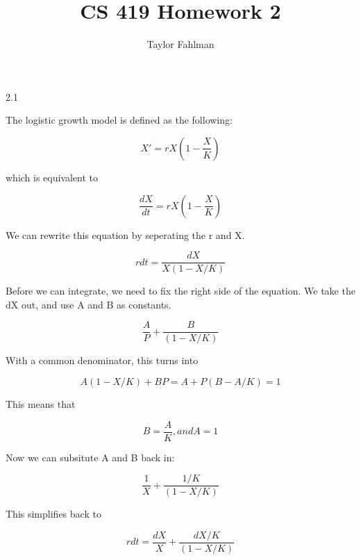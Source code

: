 \documentclass{article}
\begin{document}
\title{CS 419 Homework 2}
\author{Taylor Fahlman}
\maketitle
\begin{flushleft}
2.1\\
\end{flushleft}

The logistic growth model is defined as the following:

\begin{equation}
    X' = rX(1-\dfrac{X}{K})
\end{equation}

which is equivalent to

\begin{equation}
    \dfrac{dX}{dt} = rX(1-\dfrac{X}{K})
\end{equation}
    
We can rewrite this equation by seperating the r and X.

\begin{equation}
    r dt = \dfrac{dX}{X(1-X/K)}
\end{equation}

Before we can integrate, we need to fix the right side of the equation. We take the dX out, and use A and B as constants.

\begin{equation}
    \dfrac{A}{P} + \dfrac{B}{(1-X/K)}
\end{equation}

With a common denominator, this turns into

\begin{equation}
    A(1-X/K) + BP = A + P(B-A/K) = 1
\end{equation}

This means that

\begin{equation}
    B = \dfrac{A}{K}, and A = 1
\end{equation}

Now we can subsitute A and B back in:

\begin{equation}
    \dfrac{1}{X} + \dfrac{1/K}{(1-X/K)}
\end{equation}

This simplifies back to 

\begin{equation}
    r dt = \dfrac{dX}{X} + \dfrac{dX/K}{(1-X/K)}
\end{equation}
\end{document}
